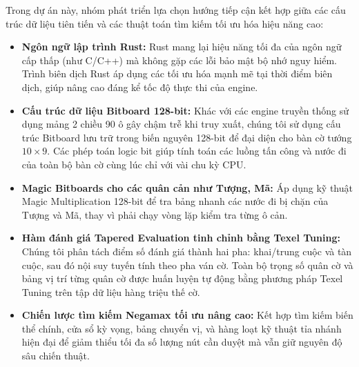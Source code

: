 Trong dự án này, nhóm phát triển lựa chọn hướng tiếp cận kết hợp giữa các cấu trúc dữ liệu tiên tiến và các thuật toán tìm kiếm tối ưu hóa hiệu năng cao:
\begin{itemize}
    \item \textbf{Ngôn ngữ lập trình Rust:} Rust mang lại hiệu năng tối đa của ngôn ngữ cấp thấp (như C/C++) mà không gặp các lỗi bảo mật bộ nhớ nguy hiểm. Trình biên dịch Rust áp dụng các tối ưu hóa mạnh mẽ tại thời điểm biên dịch, giúp nâng cao đáng kể tốc độ thực thi của engine.
    \item \textbf{Cấu trúc dữ liệu Bitboard 128-bit:} Khác với các engine truyền thống sử dụng mảng 2 chiều 90 ô gây chậm trễ khi truy xuất, chúng tôi sử dụng cấu trúc Bitboard lưu trữ trong biến nguyên 128-bit để đại diện cho bàn cờ tướng $10 \times 9$. Các phép toán logic bit giúp tính toán các luồng tấn công và nước đi của toàn bộ bàn cờ cùng lúc chỉ với vài chu kỳ CPU.
    \item \textbf{Magic Bitboards cho các quân cản như Tượng, Mã:} Áp dụng kỹ thuật Magic Multiplication 128-bit để tra bảng nhanh các nước đi bị chặn của Tượng và Mã, thay vì phải chạy vòng lặp kiểm tra từng ô cản.
    \item \textbf{Hàm đánh giá Tapered Evaluation tinh chỉnh bằng Texel Tuning:} Chúng tôi phân tách điểm số đánh giá thành hai pha: khai/trung cuộc và tàn cuộc, sau đó nội suy tuyến tính theo pha ván cờ. Toàn bộ trọng số quân cờ và bảng vị trí từng quân cờ được huấn luyện tự động bằng phương pháp Texel Tuning trên tập dữ liệu hàng triệu thế cờ.
    \item \textbf{Chiến lược tìm kiếm Negamax tối ưu nâng cao:} Kết hợp tìm kiếm biến thể chính, cửa sổ kỳ vọng, bảng chuyển vị, và hàng loạt kỹ thuật tỉa nhánh hiện đại để giảm thiểu tối đa số lượng nút cần duyệt mà vẫn giữ nguyên độ sâu chiến thuật.
\end{itemize}
